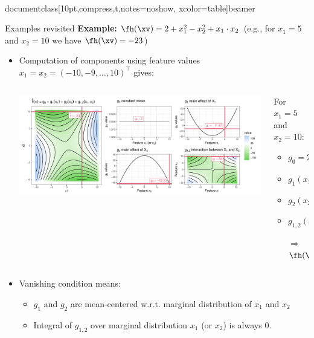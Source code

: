 \\documentclass[10pt,compress,t,notes=noshow, xcolor=table]{beamer}
\newcommand{\open}{}
\newcommand{\close}{}
\begin{document}
\begin{frame}{Examples revisited}
\textbf{Example:} $\fh(\xv) = 2 + x_1^2 - x_2^2 + x_1 \cdot x_2$ (e.g., for $x_1 = 5$ and $x_2 = 10$ we have $\fh(\xv) = -23$)

\begin{itemize}
    \item Computation of components using feature values $x_1 = x_2 = (-10, -9, \ldots, 10)^\top$ gives:
    \begin{columns}[c, totalwidth=\linewidth]
    \begin{column}{0.75\textwidth}
        \includegraphics[width = \textwidth]{figure/decomposition}
    \end{column}
    \begin{column}{0.25\textwidth}
    For $x_1 = 5$ and $x_2 = 10$:\\
    \begin{itemize}
        \item $g_{\open \emptyset \close} = 2$
        \item $g_{\open 1 \close}(x_1) = -9.67$
        \item $g_{\open 2 \close}(x_2) = -65.33$
        \item $g_{\open 1,2 \close}(x_1, x_2) = 50$
        \item[$\Rightarrow$] $\fh(\xv) = -23$
    \end{itemize}
    \end{column}
    \end{columns}
    \item Vanishing condition means:
    \begin{itemize}
        \item $g_1$ and $g_2$ are mean-centered w.r.t. marginal distribution of $x_1$ and $x_2$
        \item Integral of $g_{1,2}$ over marginal distribution $x_1$ (or $x_2$) is always 0.
    \end{itemize}
\end{itemize} 
\end{frame}
\end{document}
